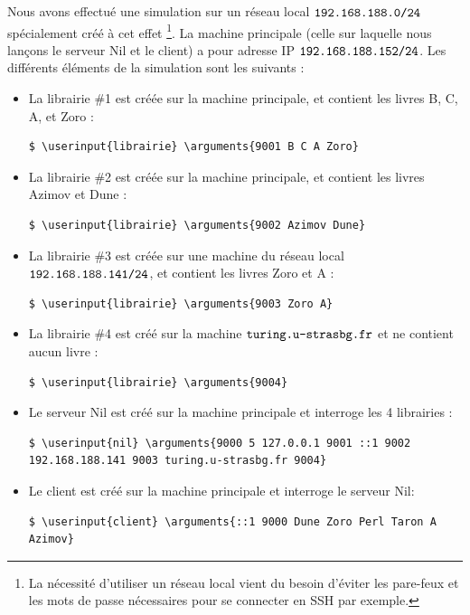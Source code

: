 \documentclass[
  french,
  twocolumn,
	9pt, %
]{fphw}
\newcommand\userinput[1]{\textbf{#1}}
\newcommand\arguments[1]{\textit{#1}}
\begin{document}
Nous avons effectué une simulation sur un réseau local $\verb|192.168.188.0/24|$ spécialement créé à cet effet \footnote{La nécessité d'utiliser un réseau local vient du besoin d'éviter les pare-feux et les mots de passe nécessaires pour se connecter en SSH par exemple.}. La machine principale (celle sur laquelle nous lançons le serveur Nil et le client) a pour adresse IP $\verb|192.168.188.152/24|$. Les différents éléments de la simulation sont les suivants : 
\begin{itemize}
  \item La librairie \#1 est créée sur la machine principale, et contient les livres B, C, A, et Zoro : \begin{Verbatim}[commandchars=\\\{\}, breaklines=true, breakanywhere=true] 
    $ \userinput{librairie} \arguments{9001 B C A Zoro}
    \end{Verbatim} 
  \item La librairie \#2 est créée sur la machine principale, et contient les livres Azimov et Dune : \begin{Verbatim}[commandchars=\\\{\}, breaklines=true, breakanywhere=true]
    $ \userinput{librairie} \arguments{9002 Azimov Dune}
    \end{Verbatim} 
  \item La librairie \#3 est créée sur une machine du réseau local $\verb|192.168.188.141/24|$, et contient les livres Zoro et A : \begin{Verbatim}[commandchars=\\\{\}, breaklines=true, breakanywhere=true]
    $ \userinput{librairie} \arguments{9003 Zoro A}
    \end{Verbatim} 
  \item La librairie \#4 est créé sur la machine $\verb|turing.u-strasbg.fr|$ et ne contient aucun livre : \begin{Verbatim}[commandchars=\\\{\}, breaklines=true, breakanywhere=true]
    $ \userinput{librairie} \arguments{9004}
    \end{Verbatim} 
  \item Le serveur Nil est créé sur la machine principale et interroge les 4 librairies : \begin{Verbatim}[commandchars=\\\{\}, breaklines=true, breakanywhere=true]
    $ \userinput{nil} \arguments{9000 5 127.0.0.1 9001 ::1 9002 192.168.188.141 9003 turing.u-strasbg.fr 9004}
    \end{Verbatim} 
  \item Le client est créé sur la machine principale et interroge le serveur Nil: \begin{Verbatim}[commandchars=\\\{\}, breaklines=true, breakanywhere=true]
    $ \userinput{client} \arguments{::1 9000 Dune Zoro Perl Taron A Azimov}
    \end{Verbatim} 
\end{itemize}
\end{document}
